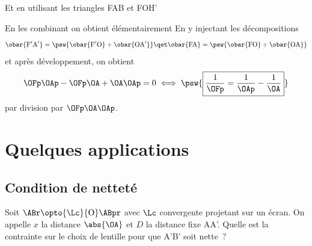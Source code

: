 \documentclass[../../main/main.tex]{subfiles}
\begin{document}
\begin{tcb*}[label=demo:lent_rc,
		list entry={\lte Rela$^\circ$ de conjug.\ et $\gamma$ des lentilles},
		breakable]
\begin{isd}
{		}%
		\tcblower
		Et en utilisant les triangles FAB et FOH'
	\end{isd}
	En les combinant on obtient élémentairement
	En y injectant les décompositions
	\begin{equation*}
		\obar{\rm F'A'} = \psw{%
			\obar{\rm F'O} + \obar{\rm OA'}
		}%
		\qet
		\obar{\rm FA} = \psw{%
			\obar{\rm FO} + \obar{\rm OA}
		}%
	\end{equation*}
	et après développement, on obtient
	\begin{equation*}
		\OFp\OAp - \OFp\OA + \OA\OAp = 0
		\iff
		\psw{%
			\boxed{
				\frac{1}{\OFp} = \frac{1}{\OAp} - \frac{1}{\OA}
			}%
		}%
	\end{equation*}
	par division par $\OFp\OA\OAp$.
\end{tcb*}

\section{Quelques applications}

\subsection{Condition de netteté}

Soit $\ABr \opto{\Lc}{\rm O} \ABpr$ avec $\Lc$ convergente projetant sur un écran. On
appelle $x$ la distance $ \abs{\OA}$ et $D$ la distance fixe AA'.
Quelle est la contrainte sur le choix de lentille pour que A'B' soit nette~?
\end{document}
